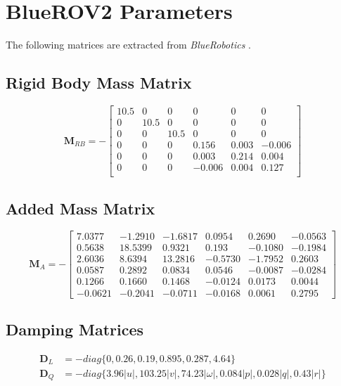 \chapter{BlueROV2 Parameters}
The following matrices are extracted from \textit{BlueRobotics} \cite{blue}.
\section*{Rigid Body Mass Matrix}
\begin{equation}
    \mathbf{M}_{RB} = - \begin{bmatrix}
    10.5 & 0 & 0 & 0 & 0 & 0 \\
    0 & 10.5 & 0 & 0 & 0 & 0 \\
    0 & 0 & 10.5 & 0 & 0 & 0 \\
    0 & 0 & 0 & 0.156 & 0.003 & -0.006 \\
    0 & 0 & 0 & 0.003 & 0.214 & 0.004 \\
    0 & 0 & 0 & -0.006 & 0.004 & 0.127 \\
    \end{bmatrix}
\end{equation}
\section*{Added Mass Matrix}
\begin{equation}
    \mathbf{M}_{A} = - \begin{bmatrix}
    7.0377 & -1.2910 & -1.6817 & 0.0954 & 0.2690 & -0.0563 \\
    0.5638 & 18.5399 & 0.9321 & 0.193 & -0.1080 & -0.1984 \\
    2.6036 & 8.6394 & 13.2816 & -0.5730 & -1.7952 & 0.2603 \\
    0.0587 & 0.2892 & 0.0834 & 0.0546 & -0.0087 & -0.0284 \\
    0.1266 & 0.1660 & 0.1468 & -0.0124 & 0.0173 & 0.0044 \\
    -0.0621 & -0.2041 & -0.0711 & -0.0168 & 0.0061 & 0.2795 
    \end{bmatrix}
\end{equation}
\section*{Damping Matrices}
\begin{align}
    \mathbf{D}_{L} & = -diag\{0, 0.26, 0.19, 0.895, 0.287, 4.64\} \\
    \mathbf{D}_{Q} & = -diag\{3.96|u|, 103.25|v|, 74.23|\omega|, 0.084|p|, 0.028|q|, 0.43|r|\}
\end{align}